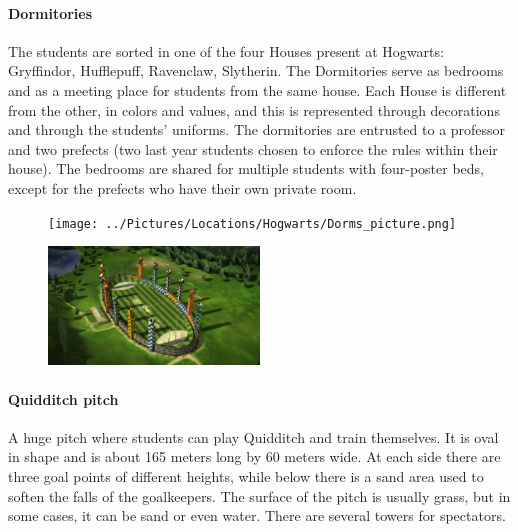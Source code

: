 \paragraph{Dormitories}
The students are sorted in one of the four Houses present at Hogwarts: Gryffindor, Hufflepuff, Ravenclaw, Slytherin. The Dormitories serve as bedrooms and as a meeting place for students from the same house. Each House is different from the other, in colors and values, and this is represented through decorations and through the students' uniforms.  The dormitories are entrusted to a professor and two prefects (two last year students chosen to enforce the rules within their house). The bedrooms are shared for multiple students with four-poster beds, except for the prefects who have their own private room.
\begin{figure}[H]
\texttt{[image: ../Pictures/Locations/Hogwarts/Dorms\_picture.png]} 
\end{figure}

\begin{figure}
\centering
\includegraphics[max width=0.5\textwidth]{../Pictures/Locations/Hogwarts/Quidditch_Field_picture.jpg} 
\end{figure}
\paragraph{Quidditch pitch}
A huge pitch where students can play Quidditch and train themselves. It is oval in shape and is about 165 meters long by 60 meters wide. At each side there are three goal points of different heights, while below there is a sand area used to soften the falls of the goalkeepers. The surface of the pitch is usually grass, but in some cases, it can be sand or even water. There are several towers for spectators.

